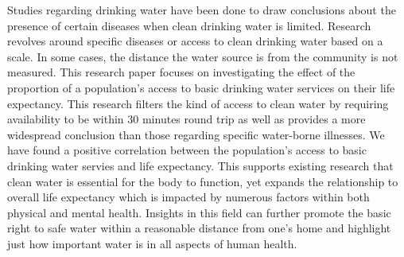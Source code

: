 \documentclass[12pt]{article}
\begin{document}
Studies regarding drinking water have been done to draw conclusions about the presence of certain diseases when clean drinking water is limited. Research revolves around specific diseases or access to clean drinking water based on a scale. In some cases, the distance the water source is from the community is not measured. This research paper focuses on investigating the effect of the proportion of a population's access to basic drinking water services on their life expectancy. This research filters the kind of access to clean water by requiring availability to be within 30 minutes round trip as well as provides a more widespread conclusion than those regarding specific water-borne illnesses. We have found a positive correlation between the population's access to basic drinking water servies and life expectancy. This supports existing research that clean water is essential for the body to function, yet expands the relationship to overall life expectancy which is impacted by numerous factors within both physical and mental health. Insights in this field can further promote the basic right to safe water within a reasonable distance from one's home and highlight just how important water is in all aspects of human health.

\newpage



\end{document}
